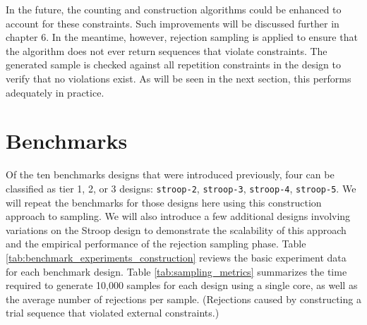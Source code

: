 In the future, the counting and construction algorithms could be enhanced to account for these constraints. Such improvements will be discussed further in chapter 6. In the meantime, however, rejection sampling is applied to ensure that the algorithm does not ever return sequences that violate constraints. The generated sample is checked against all repetition constraints in the design to verify that no violations exist. As will be seen in the next section, this performs adequately in practice.


\section{Benchmarks}

Of the ten benchmarks designs that were introduced previously, four can be classified as tier 1, 2, or 3 designs: \texttt{stroop-2}, \texttt{stroop-3}, \texttt{stroop-4}, \texttt{stroop-5}. We will repeat the benchmarks for those designs here using this construction approach to sampling. We will also introduce a few additional designs involving variations on the Stroop design to demonstrate the scalability of this approach and the empirical performance of the rejection sampling phase. Table \ref{tab:benchmark_experiments_construction} reviews the basic experiment data for each benchmark design. Table \ref{tab:sampling_metrics} summarizes the time required to generate 10,000 samples for each design using a single core, as well as the average number of rejections per sample. (Rejections caused by constructing a trial sequence that violated external constraints.)


